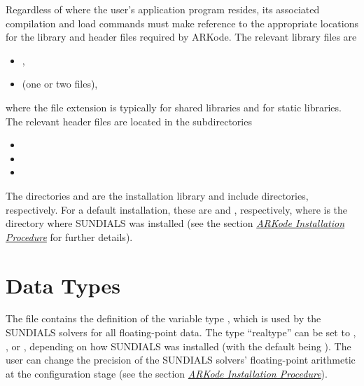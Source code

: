 \documentclass[letterpaper,10pt,english]{sphinxmanual}
\begin{document}
Regardless of where the user's application program resides, its
associated compilation and load commands must make reference to the
appropriate locations for the library and header files required by
ARKode. The relevant library files are
\begin{itemize}
\item {} 
,

\item {} 
 (one or two files),

\end{itemize}

where the file extension  is typically  for shared
libraries and  for static libraries.  The relevant header files
are located in the subdirectories
\begin{itemize}
\item {} 

\item {} 

\item {} 

\end{itemize}

The directories  and  are the installation library
and include directories, respectively.  For a default installation,
these are  and , respectively, where
 is the directory where SUNDIALS was installed (see the
section {\hyperref[Install:installation]{\emph{ARKode Installation Procedure}}} for further details).


\section{Data Types}
\label{c_interface/General:cinterface-datatypes}\label{c_interface/General:data-types}
The  file contains the definition of the variable
type , which is used by the SUNDIALS solvers for all
floating-point data.  The type ``realtype'' can be set to
, , or , depending on how SUNDIALS
was installed (with the default being ). The user can change
the precision of the SUNDIALS solvers' floating-point arithmetic at the
configuration stage (see the section {\hyperref[Install:installation]{\emph{ARKode Installation Procedure}}}).
\end{document}

